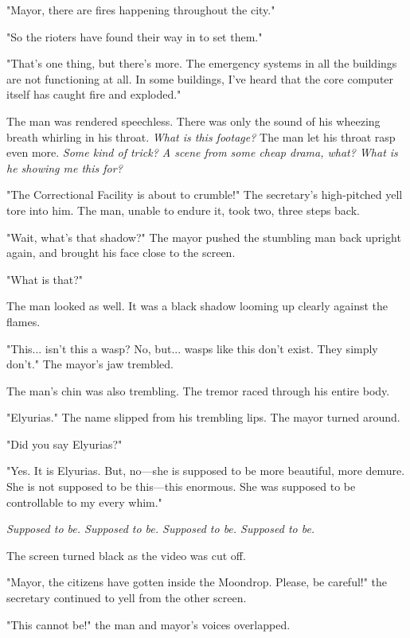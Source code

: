 "Mayor, there are fires happening throughout the city."

"So the rioters have found their way in to set them."

"That's one thing, but there's more. The emergency systems in all the
buildings are not functioning at all. In some buildings, I've heard that
the core computer itself has caught fire and exploded."

The man was rendered speechless. There was only the sound of his
wheezing breath whirling in his throat. \emph{What is this footage?} The man
let his throat rasp even more. \emph{Some kind of trick? A scene from some
cheap drama, what? What is he showing me this for?}

"The Correctional Facility is about to crumble!" The secretary's
high-pitched yell tore into him. The man, unable to endure it, took two,
three steps back.

"Wait, what's that shadow?" The mayor pushed the stumbling man back
upright again, and brought his face close to the screen.

"What is that?"

The man looked as well. It was a black shadow looming up clearly against
the flames.

"This... isn't this a wasp? No, but... wasps like this don't exist. They
simply don't." The mayor's jaw trembled.

The man's chin was also trembling. The tremor raced through his entire
body.

"Elyurias." The name slipped from his trembling lips. The mayor turned
around.

"Did you say Elyurias?"

"Yes. It is Elyurias. But, no---she is supposed to be more beautiful, more
demure. She is not supposed to be this---this enormous. She was supposed
to be controllable to my every whim."

\emph{Supposed to be. Supposed to be. Supposed to be. Supposed to be.}

The screen turned black as the video was cut off.

"Mayor, the citizens have gotten inside the Moondrop. Please, be
careful!" the secretary continued to yell from the other screen.

"This cannot be!" the man and mayor's voices overlapped.